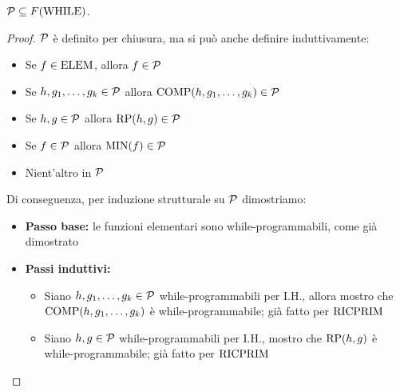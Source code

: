\begin{theor}
	$\mathcal{P} \subseteq F(\text{WHILE})$.
\end{theor}
\begin{proof}
	$\mathcal{P}$ è definito per chiusura, ma si può anche definire induttivamente:
	\begin{itemize}
		\item Se $f \in \text{ELEM}$, allora $f \in \mathcal{P}$
        
		\item Se $h, g_1, \dots, g_k \in \mathcal{P}$ allora $\text{COMP} (h, g_1, \dots, g_k) \in \mathcal{P}$
		
        \item Se $h,g \in \mathcal{P}$ allora $\text{RP} (h,g) \in \mathcal{P}$
		
        \item Se $f \in \mathcal{P}$ allora $\operatorname{MIN}(f) \in \mathcal{P}$
		
        \item Nient'altro in $\mathcal{P}$
	\end{itemize}
	
	Di conseguenza, per induzione strutturale su $\mathcal{P}$ dimostriamo:
	\begin{itemize}
		\item \textbf{Passo base:} le funzioni elementari sono while-programmabili, come già dimostrato
		
        \item \textbf{Passi induttivi:}
		\begin{itemize}
			\item Siano $h,g_1, \dots, g_k \in \mathcal{P}$ while-programmabili per I.H., allora mostro che $\text{COMP} (h, g_1, \dots, g_k)$ è while-programmabile; già fatto per $\text{RICPRIM}$
		
        	\item Siano $h,g \in \mathcal{P}$ while-programmabili per I.H., mostro che $\text{RP}(h,g)$ è while-programmabile; già fatto per $\text{RICPRIM}$
		

\end{itemize}
\end{itemize}
\end{proof}
